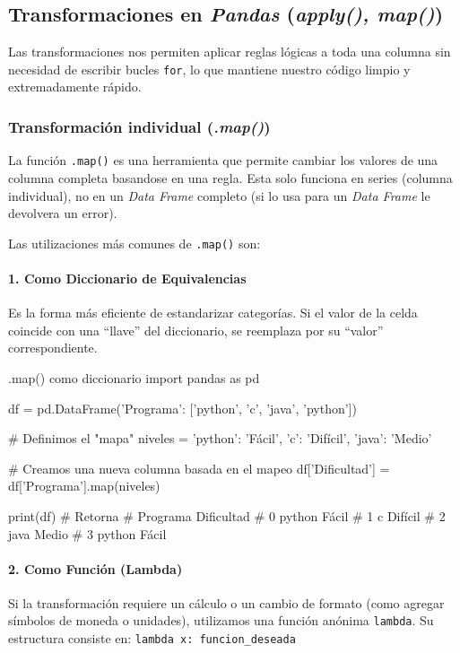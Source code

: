 \subsection{Transformaciones en \textit{Pandas} (\textit{apply(), map()})}

Las transformaciones nos permiten aplicar reglas lógicas a toda una columna sin necesidad de escribir bucles \texttt{for}, lo que mantiene nuestro código limpio y extremadamente rápido.

\subsubsection{Transformación individual (\textit{.map()})}

La función \texttt{.map()} es una herramienta que permite cambiar los valores de una columna completa basandose en una regla. Esta solo funciona en series (columna individual), no en un \textit{Data Frame} completo (si lo usa para un \textit{Data Frame} le devolvera un error).

Las utilizaciones más comunes de \texttt{.map()} son:
\paragraph{1. Como Diccionario de Equivalencias}
Es la forma más eficiente de estandarizar categorías. Si el valor de la celda coincide con una ``llave'' del diccionario, se reemplaza por su ``valor'' correspondiente.
\begin{pycode}{.map() como diccionario}
import pandas as pd

df = pd.DataFrame({'Programa': ['python', 'c', 'java', 'python']})

# Definimos el "mapa"
niveles = {
    'python': 'Fácil',
    'c': 'Difícil',
    'java': 'Medio'
}

# Creamos una nueva columna basada en el mapeo
df['Dificultad'] = df['Programa'].map(niveles)

print(df) # Retorna 
#   Programa Dificultad
# 0   python      Fácil
# 1        c    Difícil
# 2     java      Medio
# 3   python      Fácil   
\end{pycode}

\paragraph{2. Como Función (Lambda)}
Si la transformación requiere un cálculo o un cambio de formato (como agregar símbolos de moneda o unidades), utilizamos una función anónima \texttt{lambda}.
Su estructura consiste en: \texttt{lambda x: funcion\_deseada}

